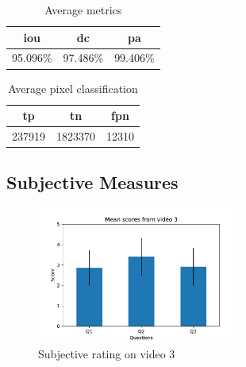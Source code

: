 \begin{minipage}[c]{0.475\textwidth}
\begin{table}[H]
    \centering
    \begin{tabular}{||c c c||} 
        \hline
        \acrshort{iou} & \acrshort{dc} & \acrshort{pa} \\ [0.5ex] 
        \hline\hline
        95.096\% & 97.486\% & 99.406\% \\ [1ex] 
        \hline
    \end{tabular}
    \caption{Average metrics}
    \label{tab:metrics_video_3}
\end{table}
\end{minipage}
\begin{minipage}[c]{0.475\textwidth}
\begin{table}[H]
    \centering
    \begin{tabular}{||c c c||} 
        \hline
        \acrshort{tp} & \acrshort{tn} & \acrshort{fpn} \\ [0.5ex] 
        \hline\hline
        237919 & 1823370 & 12310 \\ [1ex] 
        \hline
    \end{tabular}
    \caption{Average pixel classification}
    \label{tab:pixels_video_3}
\end{table}
\end{minipage}

\subsection{Subjective Measures}

\begin{figure}[H]
    \centering
    \includegraphics[width=0.6\textwidth]{img/subjective_measures/analysis/video_3.pdf}
    \caption{Subjective rating on video 3}
    \label{fig:visual_subj_vid3}
\end{figure}


